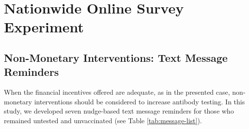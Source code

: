 \documentclass[
]{article}
\begin{document}
\hypertarget{experiment}{%
\section{Nationwide Online Survey Experiment}\label{experiment}}

\hypertarget{intervention}{%
\subsection{Non-Monetary Interventions: Text Message Reminders}\label{intervention}}

When the financial incentives offered are adequate, as in the presented case, non-monetary interventions should be considered to increase antibody testing. In this study, we developed seven nudge-based text message reminders for those who remained untested and unvaccinated (see Table \ref{tab:message-list}).
\end{document}
